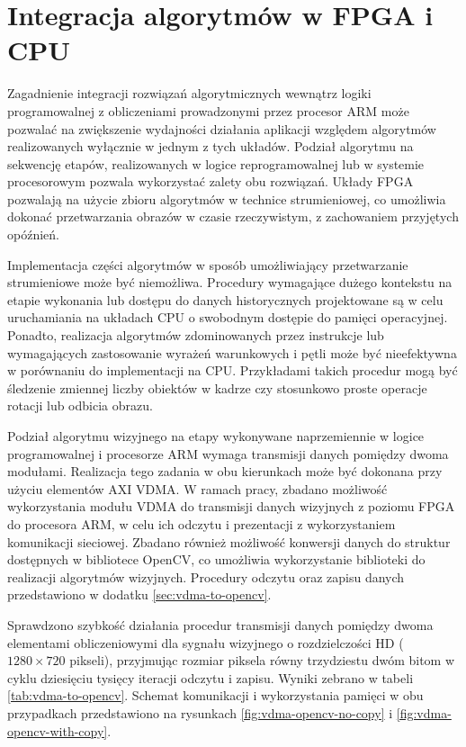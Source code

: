 \section{Integracja algorytmów w FPGA i CPU}


Zagadnienie integracji rozwiązań algorytmicznych wewnątrz logiki programowalnej z obliczeniami prowadzonymi przez procesor ARM może pozwalać na zwiększenie wydajności działania aplikacji względem algorytmów realizowanych wyłącznie w jednym z tych układów.
Podział algorytmu na sekwencję etapów, realizowanych w logice reprogramowalnej lub w systemie procesorowym pozwala wykorzystać zalety obu rozwiązań. 
Układy FPGA pozwalają na użycie zbioru algorytmów w technice strumieniowej, co umożliwia dokonać przetwarzania obrazów w czasie rzeczywistym, z zachowaniem przyjętych opóźnień. 

Implementacja części algorytmów w sposób umożliwiający przetwarzanie strumieniowe może być niemożliwa. 
Procedury wymagające dużego kontekstu na etapie wykonania lub dostępu do danych historycznych projektowane są w celu uruchamiania na układach CPU o swobodnym dostępie do pamięci operacyjnej. 
Ponadto, realizacja algorytmów zdominowanych przez instrukcje lub wymagających zastosowanie wyrażeń warunkowych i pętli może być nieefektywna w porównaniu do implementacji na CPU. 
Przykładami takich procedur mogą być śledzenie zmiennej liczby obiektów w kadrze czy stosunkowo proste operacje rotacji lub odbicia obrazu.

Podział algorytmu wizyjnego na etapy wykonywane naprzemiennie w logice programowalnej i procesorze ARM wymaga transmisji danych pomiędzy dwoma modułami. 
Realizacja tego zadania w obu kierunkach może być dokonana przy użyciu elementów AXI VDMA.
W ramach pracy, zbadano możliwość wykorzystania modułu VDMA do transmisji danych wizyjnych z poziomu FPGA do procesora ARM, w celu ich odczytu i prezentacji z wykorzystaniem komunikacji sieciowej.
Zbadano również możliwość konwersji danych do struktur dostępnych w bibliotece OpenCV, co umożliwia wykorzystanie biblioteki do realizacji algorytmów wizyjnych. 
Procedury odczytu oraz zapisu danych przedstawiono w dodatku \ref{sec:vdma-to-opencv}.

Sprawdzono szybkość działania procedur transmisji danych pomiędzy dwoma elementami obliczeniowymi dla sygnału wizyjnego o rozdzielczości HD ($1280 \times 720$ pikseli), przyjmując rozmiar piksela równy trzydziestu dwóm bitom w cyklu dziesięciu tysięcy iteracji odczytu i zapisu. Wyniki zebrano w tabeli \ref{tab:vdma-to-opencv}. Schemat komunikacji i wykorzystania pamięci w obu przypadkach przedstawiono na rysunkach \ref{fig:vdma-opencv-no-copy} i \ref{fig:vdma-opencv-with-copy}.

